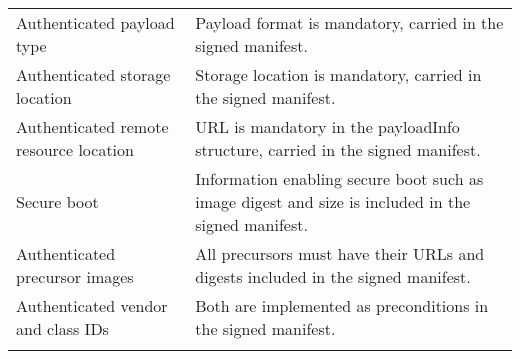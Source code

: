 \begin{longtable}[]{@{}ll@{}}
\begin{minipage}[t]{0.37\columnwidth}
Authenticated payload type\strut
\end{minipage} & \begin{minipage}[t]{0.57\columnwidth}\raggedright\strut
Payload format is mandatory, carried in the signed manifest.\strut
\end{minipage}\tabularnewline
\begin{minipage}[t]{0.37\columnwidth}\raggedright\strut
Authenticated storage location\strut
\end{minipage} & \begin{minipage}[t]{0.57\columnwidth}\raggedright\strut
Storage location is mandatory, carried in the signed manifest.\strut
\end{minipage}\tabularnewline
\begin{minipage}[t]{0.37\columnwidth}\raggedright\strut
Authenticated remote resource location\strut
\end{minipage} & \begin{minipage}[t]{0.57\columnwidth}\raggedright\strut
URL is mandatory in the payloadInfo structure, carried in the signed
manifest.\strut
\end{minipage}\tabularnewline
\begin{minipage}[t]{0.37\columnwidth}\raggedright\strut
Secure boot\strut
\end{minipage} & \begin{minipage}[t]{0.57\columnwidth}\raggedright\strut
Information enabling secure boot such as image digest and size is
included in the signed manifest.\strut
\end{minipage}\tabularnewline
\begin{minipage}[t]{0.37\columnwidth}\raggedright\strut
Authenticated precursor images\strut
\end{minipage} & \begin{minipage}[t]{0.57\columnwidth}\raggedright\strut
All precursors must have their URLs and digests included in the signed
manifest.\strut
\end{minipage}\tabularnewline
\begin{minipage}[t]{0.37\columnwidth}\raggedright\strut
Authenticated vendor and class IDs\strut
\end{minipage} & \begin{minipage}[t]{0.57\columnwidth}\raggedright\strut
Both are implemented as preconditions in the signed manifest.\strut
\end{minipage}\tabularnewline
\begin{minipage}[t]{0.37\columnwidth}\raggedright\strut

\end{minipage}
\end{longtable}

